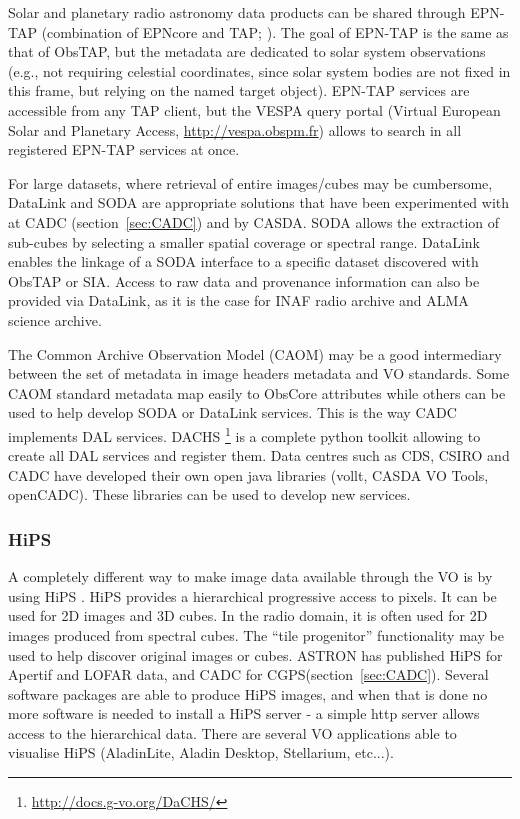\documentclass[11pt,a4paper]{ivoa}
\begin{document}
Solar and planetary radio astronomy data products can be shared through EPN-TAP (combination of EPNcore 
and TAP; \cite{std:EPNTAP}). The goal of EPN-TAP is the same as that of ObsTAP, but the metadata are 
dedicated to solar system observations (e.g., not requiring celestial coordinates, since solar system 
bodies are not fixed in this frame, but relying on the named target object). EPN-TAP services are 
accessible from any TAP client, but the VESPA query portal (Virtual European Solar and Planetary Access, 
\url{http://vespa.obspm.fr}) allows to search in all registered EPN-TAP services at once.

For large datasets, where retrieval of entire images/cubes may be cumbersome,  DataLink and SODA are 
appropriate solutions that have been experimented with at CADC (section~\ref{sec:CADC}) and by CASDA. 
SODA allows the extraction of sub-cubes by selecting a smaller spatial coverage or spectral range. 
DataLink enables the linkage of a SODA interface to a specific dataset discovered with ObsTAP or SIA. 
Access to raw data and provenance information can also be provided via DataLink, as it is the case for 
INAF radio archive and ALMA science archive.

The Common Archive Observation Model (CAOM) may be a good intermediary between the set of metadata in 
image headers metadata and VO standards. Some CAOM standard metadata map easily to ObsCore attributes 
while others can be used to help develop SODA or DataLink services. This is the way CADC implements DAL 
services. DACHS \footnote{\url{http://docs.g-vo.org/DaCHS/}} is a complete python toolkit allowing to 
create all DAL services and register them. Data centres such as CDS, CSIRO and CADC have developed their 
own open java libraries (vollt, CASDA VO Tools, openCADC). These libraries can be used to develop new 
services.


\subsubsection{HiPS}
A completely different way to make image data available through the VO is by using HiPS 
\citep{2017ivoa.spec.0519F}. HiPS provides a hierarchical progressive access to pixels. It can be used 
for 2D images and 3D cubes. In the radio domain, it is often used for 2D images produced from spectral 
cubes. The ``tile progenitor''  functionality may be used to help discover original images or cubes. 
ASTRON has published HiPS for Apertif and LOFAR data, and CADC for CGPS(section~\ref{sec:CADC}). Several 
software packages are able to produce HiPS images, and when that is done no more software is needed to 
install a HiPS server - a simple http server allows access to the hierarchical data. There are several 
VO applications able to visualise HiPS (AladinLite, Aladin Desktop, Stellarium, etc...). 
\end{document}
